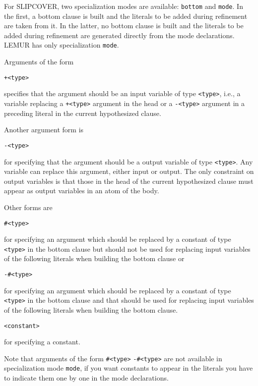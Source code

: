For SLIPCOVER, two specialization modes are available: \verb|bottom| and \verb|mode|.
In the first, a bottom clause is built and the literals to be added during 
refinement are taken from it. In the latter, no bottom clause is built and
the literals to be added during refinement are generated 
directly from the mode declarations. 
LEMUR has only specialization \verb|mode|.

Arguments of the form
\begin{verbatim}
+<type>
\end{verbatim}
specifies that the argument should be an input variable of type \texttt{<type>}, i.e., a variable replacing a \texttt{+<type>} argument in the head or a \texttt{-<type>} argument in a preceding literal in the current hypothesized clause.

Another argument form is
\begin{verbatim}
-<type>
\end{verbatim}
for specifying that the argument should be a output variable of type \texttt{<type>}. 
Any variable can replace this argument, either input or output.
The only constraint on output variables is that those in the head of the current hypothesized 
clause must appear as output variables in an atom of the body.

Other forms are
\begin{verbatim}
#<type>
\end{verbatim}
for specifying an argument which should be replaced by a constant of type \texttt{<type>} in the bottom clause but should not be used for replacing input variables of the following literals when building the bottom clause or 
\begin{verbatim}
-#<type>
\end{verbatim}
for specifying an argument which should be replaced by a constant of type \texttt{<type>} in the bottom clause and that should be used for replacing input variables of the following literals when building the bottom clause. 
\begin{verbatim}
<constant>
\end{verbatim}
for specifying a constant.

Note that arguments of the form
\verb|#<type>| \verb|-#<type>| are not available in 
specialization mode \verb|mode|, if you want constants to appear in 
the literals you have to indicate them one by one in the mode declarations.


